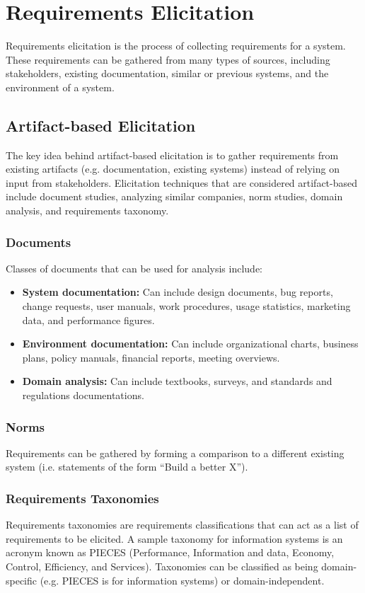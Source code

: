 \documentclass[12pt,titlepage]{article}
\let\stdsection\section
\renewcommand\section{\clearpage\stdsection}
\begin{document}
  \section{Requirements Elicitation}
    Requirements elicitation is the process of collecting requirements for a system. These requirements can be gathered from many types of sources,
    including stakeholders, existing documentation, similar or previous systems, and the environment of a system.

    \subsection{Artifact-based Elicitation}
      The key idea behind artifact-based elicitation is to gather requirements from existing artifacts (e.g. documentation, existing systems)
      instead of relying on input from stakeholders. Elicitation techniques that are considered artifact-based include
      document studies, analyzing similar companies, norm studies, domain analysis, and requirements taxonomy.

      \subsubsection{Documents}
        Classes of documents that can be used for analysis include:
        \begin{itemize}
          \item \textbf{System documentation:} Can include design documents, bug reports, change requests, user manuals, work procedures, usage statistics,
          marketing data, and performance figures.
          \item \textbf{Environment documentation:} Can include organizational charts, business plans, policy manuals, financial reports, meeting overviews.
          \item \textbf{Domain analysis:} Can include textbooks, surveys, and standards and regulations documentations.
        \end{itemize}

      \subsubsection{Norms}
        Requirements can be gathered by forming a comparison to a different existing system (i.e. statements of the form ``Build a better X'').

      \subsubsection{Requirements Taxonomies}
        Requirements taxonomies are requirements classifications that can act as a list of requirements to be elicited. A sample taxonomy for information
        systems is an acronym known as PIECES (Performance, Information and data, Economy, Control, Efficiency, and Services). Taxonomies can be classified
        as being domain-specific (e.g. PIECES is for information systems) or domain-independent.
\end{document}
